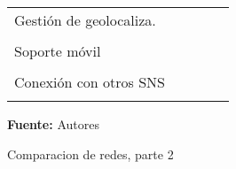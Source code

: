 \begin{landscape}
\begin{table}
\begin{center}
{\begin{tabular}{|p{5cm}|llll|}
    \hline
    Gestión de geolocaliza. & \multicolumn{1}{c}{} & \multicolumn{1}{c}{} & \multicolumn{1}{c}{} & \multicolumn{1}{c|}{} \\ 
     & \multicolumn{1}{c}{} & \multicolumn{1}{c}{} & \multicolumn{1}{c}{} & \multicolumn{1}{c|}{} \\ 
    \hline
    Soporte móvil & \multicolumn{1}{c}{} & \multicolumn{1}{c}{} & \multicolumn{1}{c}{} & \multicolumn{1}{c|}{} \\ 
     & \multicolumn{1}{c}{} & \multicolumn{1}{c}{} & \multicolumn{1}{c}{} & \multicolumn{1}{c|}{} \\ 
    \hline
    Conexión con otros SNS & \multicolumn{1}{c}{} & \multicolumn{1}{c}{} & \multicolumn{1}{c}{} & \multicolumn{1}{c|}{} \\ 
     & \multicolumn{1}{c}{} & \multicolumn{1}{c}{} & \multicolumn{1}{c}{} & \multicolumn{1}{c|}{} \\ 
    \hline
  \end{tabular}
  }
  \textbf{Fuente:} Autores
    \end{center}
\end{table}
  
  \newpage
  
  \begin{table}
  \caption{Comparacion de redes, parte 2}
  \label{tab:comparacion_redes_2}

  \begin{center}
  

\end{center}
\end{table}
\end{landscape}
